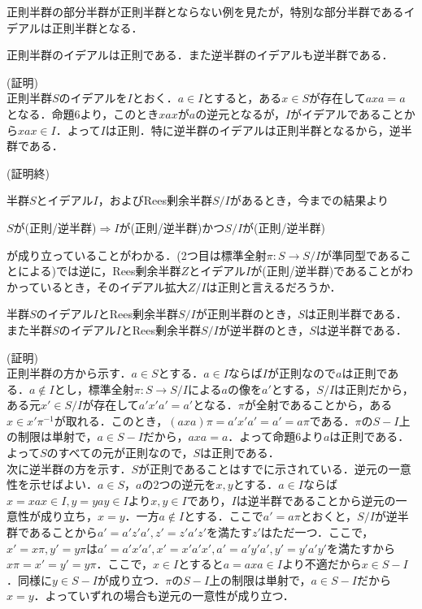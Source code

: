 正則半群の部分半群が正則半群とならない例を見たが，特別な部分半群であるイデアルは正則半群となる．
\begin{sprop}
正則半群のイデアルは正則である．また逆半群のイデアルも逆半群である．
\end{sprop}
(証明)\\
正則半群$S$のイデアルを$I$とおく．$a\in I$とすると，ある$x\in S$が存在して$axa=a$となる．命題6より，このとき$xax$が$a$の逆元となるが，$I$がイデアルであることから$xax\in I$．よって$I$は正則．特に逆半群のイデアルは正則半群となるから，逆半群である．
\begin{flushright}
(証明終)
\end{flushright}
半群$S$とイデアル$I$，およびRees剰余半群$S/I$があるとき，今までの結果より
\begin{center}
 $S$が(正則/逆半群)$\Rightarrow I$が(正則/逆半群)かつ$S/I$が(正則/逆半群)
\end{center}
が成り立っていることがわかる．(2つ目は標準全射$\pi:S\rightarrow S/I$が準同型であることによる)では逆に，Rees剰余半群$Z$とイデアル$I$が(正則/逆半群)であることがわかっているとき，そのイデアル拡大$Z/I$は正則と言えるだろうか．
\begin{sthm}
半群$S$のイデアル$I$とRees剰余半群$S/I$が正則半群のとき，$S$は正則半群である．また半群$S$のイデアル$I$とRees剰余半群$S/I$が逆半群のとき，$S$は逆半群である．
\end{sthm}
(証明)\\
正則半群の方から示す．$a\in S$とする．$a\in I$ならば$I$が正則なので$a$は正則である．$a\notin I$とし，標準全射$\pi:S\rightarrow S/I$による$a$の像を$a'$とする，$S/I$は正則だから，ある元$x'\in S/I$が存在して$a'x'a'=a'$となる．$\pi$が全射であることから，ある$x\in x'\pi^{-1}$が取れる．このとき，$(axa)\pi=a'x'a'=a'=a\pi$である．$\pi$の$S-I$上の制限は単射で，$a\in S-I$だから，$axa=a$．よって命題6より$a$は正則である．よって$S$のすべての元が正則なので，$S$は正則である．\\
次に逆半群の方を示す．$S$が正則であることはすでに示されている．逆元の一意性を示せばよい．$a\in S$，$a$の2つの逆元を$x,y$とする．$a\in I$ならば$x=xax\in I,y=yay\in I$より$x,y\in I$であり，$I$は逆半群であることから逆元の一意性が成り立ち，$x=y$．一方$a\notin I$とする．ここで$a'=a\pi$とおくと，$S/I$が逆半群であることから$a'=a'z'a', z'=z'a'z'$を満たす$z'$はただ一つ．ここで，$x'=x\pi,y'=y\pi$は$a'=a'x'a', x'=x'a'x', a'=a'y'a', y'=y'a'y'$を満たすから$x\pi=x'=y'=y\pi$．ここで，$x\in I$とすると$a=axa\in I$より不適だから$x\in S-I$．同様に$y\in S-I$が成り立つ．$\pi$の$S-I$上の制限は単射で，$a\in S-I$だから$x=y$．よっていずれの場合も逆元の一意性が成り立つ．
